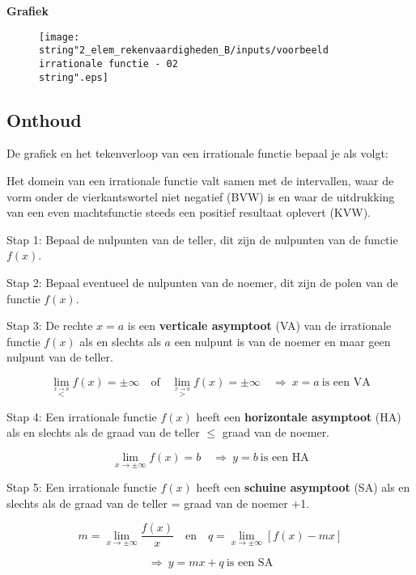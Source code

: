 \textbf{Grafiek}
\begin{figure}[h]
\centering
\texttt{[image: \\string"2\_elem\_rekenvaardigheden\_B/inputs/voorbeeld irrationale functie - 02\\string".eps]}
\end{figure}



\subsection{Onthoud}

\begin{framed}

De grafiek en het tekenverloop van een irrationale functie bepaal
je als volgt:\medskip{}

Het domein van een irrationale functie valt samen met de intervallen,
waar de vorm onder de vierkantswortel niet negatief (BVW) is en waar
de uitdrukking van een even machtsfunctie steeds een positief resultaat
oplevert (KVW).

Stap 1: Bepaal de nulpunten van de teller, dit zijn de nulpunten van
de functie $f(x)$.

Stap 2: Bepaal eventueel de nulpunten van de noemer, dit zijn de polen
van de functie $f(x)$.

Stap 3: De rechte $x=a$ is een \textbf{verticale asymptoot} (VA)
van de irrationale functie $f(x)$ als en slechts als $a$ een nulpunt
is van de noemer en maar geen nulpunt van de teller.

\[
{\displaystyle {\displaystyle \lim_{\overset{x\rightarrow a}{<}}}f(x)=\pm\infty\quad\textrm{of}\quad{\displaystyle \lim_{\overset{x\rightarrow a}{>}}}f(x)=\pm\infty\quad\Rightarrow\:x=a\:\textrm{is een VA}}
\]


Stap 4: Een irrationale functie $f(x)$ heeft een \textbf{horizontale
asymptoot} (HA) als en slechts als de graad van de teller \ensuremath{\le}
graad van de noemer.

\[
{\displaystyle {\displaystyle \lim_{x\to\pm\infty}}f(x)=b\quad\Rightarrow\:y=b\:\textrm{is een HA}}
\]


Stap 5: Een irrationale functie $f(x)$ heeft een \textbf{schuine
asymptoot} (SA) als en slechts als de graad van de teller = graad
van de noemer +1.

\[
{\displaystyle m={\displaystyle \lim_{x\to\pm\infty}}\frac{f(x)}{x}\quad\textrm{en}\quad q={\displaystyle \lim_{x\to\pm\infty}}\left[f(x)-mx\right]}
\]


\[
{\displaystyle \Rightarrow\:y=mx+q\:\textrm{is een SA}}
\]



\end{framed}
